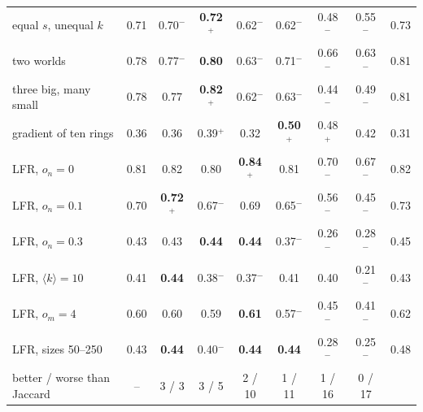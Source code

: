 \begin{table}[t]
\begin{ruledtabular}
\begin{tabular}{lccccccc|c}
equal $s$, unequal $k$ & 0.71 & 0.70$^-$ & \textbf{0.72$^+$} & 0.62$^-$ & 0.62$^-$ & 0.48$^-$ & 0.55$^-$ & 0.73 \\
two worlds & 0.78 & 0.77$^-$ & \textbf{0.80} & 0.63$^-$ & 0.71$^-$ & 0.66$^-$ & 0.63$^-$ & 0.81 \\
three big, many small & 0.78 & 0.77 & \textbf{0.82$^+$} & 0.62$^-$ & 0.63$^-$ & 0.44$^-$ & 0.49$^-$ & 0.81 \\
gradient of ten rings & 0.36 & 0.36 & 0.39$^+$ & 0.32 & \textbf{0.50$^+$} & 0.48$^+$ & 0.42 & 0.31 \\
LFR, $o_n{=}0$ & 0.81 & 0.82 & 0.80 & \textbf{0.84$^+$} & 0.81 & 0.70$^-$ & 0.67$^-$ & 0.82 \\
LFR, $o_n{=}0.1$ & 0.70 & \textbf{0.72$^+$} & 0.67$^-$ & 0.69 & 0.65$^-$ & 0.56$^-$ & 0.45$^-$ & 0.73 \\
LFR, $o_n{=}0.3$ & 0.43 & 0.43 & \textbf{0.44} & \textbf{0.44} & 0.37$^-$ & 0.26$^-$ & 0.28$^-$ & 0.45 \\
LFR, $\langle k\rangle{=}10$ & 0.41 & \textbf{0.44} & 0.38$^-$ & 0.37$^-$ & 0.41 & 0.40 & 0.21$^-$ & 0.43 \\
LFR, $o_m{=}4$ & 0.60 & 0.60 & 0.59 & \textbf{0.61} & 0.57$^-$ & 0.45$^-$ & 0.41$^-$ & 0.62 \\
LFR, sizes 50--250 & 0.43 & \textbf{0.44} & 0.40$^-$ & \textbf{0.44} & \textbf{0.44} & 0.28$^-$ & 0.25$^-$ & 0.48 \\
\hline
better / worse than Jaccard & -- & 3 / 3 & 3 / 5 & 2 / 10 & 1 / 11 & 1 / 16 & 0 / 17 & \\
\end{tabular}
\end{ruledtabular}
\end{table}

